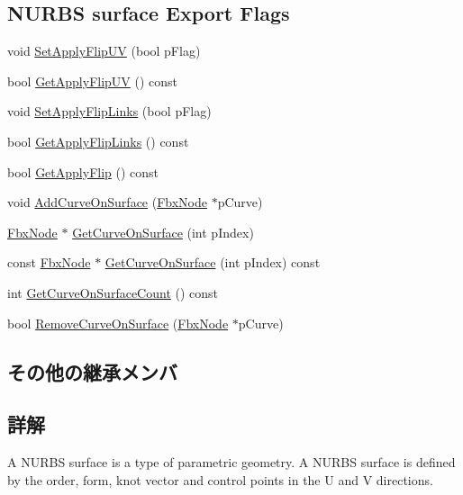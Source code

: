 \subsection*{N\+U\+R\+BS surface Export Flags}
\begin{DoxyCompactItemize}
\item 
void \hyperlink{class_fbx_nurbs_surface_aa42ffe0c0aa1e807198cb554c11f3441}{Set\+Apply\+Flip\+UV} (bool p\+Flag)
\item 
bool \hyperlink{class_fbx_nurbs_surface_affe176abf8148f5bdef5b66caf684211}{Get\+Apply\+Flip\+UV} () const
\item 
void \hyperlink{class_fbx_nurbs_surface_aa8752b1a2895f41b1ce14d3a045804df}{Set\+Apply\+Flip\+Links} (bool p\+Flag)
\item 
bool \hyperlink{class_fbx_nurbs_surface_ad772f72bf7c01a51d7c3976c4247f13d}{Get\+Apply\+Flip\+Links} () const
\item 
bool \hyperlink{class_fbx_nurbs_surface_a2fb21f20bbdbe07efdfacff8c1a9c746}{Get\+Apply\+Flip} () const
\item 
void \hyperlink{class_fbx_nurbs_surface_a4e10c230bce83672fa38c0cb168f2aa6}{Add\+Curve\+On\+Surface} (\hyperlink{class_fbx_node}{Fbx\+Node} $\ast$p\+Curve)
\item 
\hyperlink{class_fbx_node}{Fbx\+Node} $\ast$ \hyperlink{class_fbx_nurbs_surface_adfb1c6483f23f8d8b27b157d02a2ccc0}{Get\+Curve\+On\+Surface} (int p\+Index)
\item 
const \hyperlink{class_fbx_node}{Fbx\+Node} $\ast$ \hyperlink{class_fbx_nurbs_surface_a9845d1c929ec30fbc8730ea10baa1b0e}{Get\+Curve\+On\+Surface} (int p\+Index) const
\item 
int \hyperlink{class_fbx_nurbs_surface_aeb1717a47a9bfe18ebe190d22507f3a7}{Get\+Curve\+On\+Surface\+Count} () const
\item 
bool \hyperlink{class_fbx_nurbs_surface_abe5eaddfe1980604707ccd027159d6dd}{Remove\+Curve\+On\+Surface} (\hyperlink{class_fbx_node}{Fbx\+Node} $\ast$p\+Curve)
\end{DoxyCompactItemize}
\subsection*{その他の継承メンバ}


\subsection{詳解}
A N\+U\+R\+BS surface is a type of parametric geometry. A N\+U\+R\+BS surface is defined by the order, form, knot vector and control points in the U and V directions.


